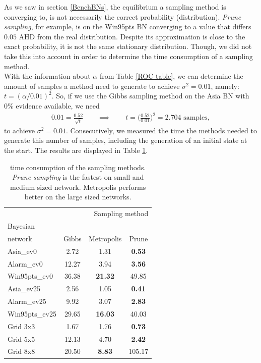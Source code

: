 \documentclass[a4paper, twoside, 11pt]{report}
\theoremstyle{plain}
\theoremstyle{definition}
\theoremstyle{remark}
\newcommand{\Ps}{\textit{Prune sampling }}
\begin{document}
As we saw in section \ref{BenchBNs}, the equilibrium a sampling method is converging to, is not necessarily the correct probability (distribution). \textit{Prune sampling}, for example, is on the Win95pts BN converging to a value that differs $0.05$ AHD from the real distribution. Despite its approximation is close to the exact probability, it is not the same stationary distribution. Though, we did not take this into account in order to determine the time consumption of a sampling method. \\
With the information about $\alpha$ from Table \ref{ROC-table}, we can determine the amount of samples a method need to generate to achieve $\sigma^2 = 0.01$, namely: $t = (\alpha / 0.01)^{2}$. So, if we use the Gibbs sampling method on the Asia BN with 0\% evidence available, we need
\begin{align*}
0.01= \frac{0.52}{\sqrt{t}} \qquad \implies \qquad t = \bigg( \frac{0.52}{0.01} \bigg)^2 = 2.704 \text{ samples},
\end{align*}
to achieve $\sigma^2 = 0.01$. Consecutively, we measured the time the methods needed to generate this number of samples, including the generation of an initial state at the start. The results are displayed in Table \ref{time-table}.
\begin{center}
\begin{table}[!htb]
\begin{center}
\begin{tabular}{l c c c}  
\toprule
\multicolumn{4}{r}{Sampling method} \\
\cmidrule(r){2-4}
Bayesian \\ network    & Gibbs    & Metropolis & Prune  \\
\midrule
Asia\_ev0 & 2.72 & 1.31 & \textbf{0.53}  \\
Alarm\_ev0 & 12.27 & 3.94 & \textbf{3.56}  \\
Win95pts\_ev0 & 36.38 & \textbf{21.32} & 49.85  \\
Asia\_ev25 & 2.56 & 1.05 & \textbf{0.41}  \\
Alarm\_ev25 & 9.92 & 3.07 & \textbf{2.83}  \\
Win95pts\_ev25 & 29.65 & \textbf{16.03} & 40.03  \\
Grid 3x3 & 1.67 & 1.76 & \textbf{0.73}  \\
Grid 5x5 & 12.13 & 4.70 & \textbf{2.42}  \\
Grid 8x8 & 20.50 & \textbf{8.83} & 105.17  \\
\bottomrule
\end{tabular}
\caption{time consumption of the sampling methods. \Ps is the fastest on small and medium sized network. Metropolis performs better on the large sized networks. }
\label{time-table}
\end{center}
\end{table}
\end{center}
\end{document}
